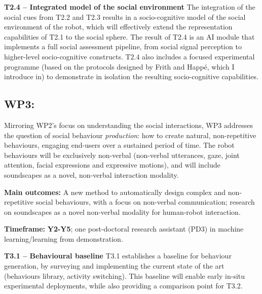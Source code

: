 \textbf{T2.4 -- Integrated model of the social environment} The integration of
the social cues from T2.2 and T2.3 results in a socio-cognitive model of the
social environment of the robot, which will effectively extend the representation
capabilities of T2.1 to the social sphere. The result of T2.4 is an AI module
that implements a full social assessment pipeline, from social signal perception
to higher-level socio-cognitive constructs. T2.4 also includes a
focused experimental programme (based on the protocols designed by Frith and
Happé, which I introduce in) to
demonstrate in isolation the resulting socio-cognitive capabilities.


\subsection{WP3: \textbf{\wpThree}} 

Mirroring WP2's focus on understanding the social interactions, WP3 addresses the
question of social behaviour \emph{production}: how to create natural,
non-repetitive behaviours, engaging end-users over a sustained period of time. The robot
behaviours will be exclusively non-verbal (non-verbal utterances, gaze, joint
attention, facial expressions and expressive motions), and will include
soundscapes as a novel, non-verbal interaction modality.

\begin{framed}

    \textbf{Main outcomes:} A new method to automatically design complex and
    non-repetitive social behaviours, with a focus on non-verbal communication;
    research on soundscapes as a novel non-verbal modality for human-robot
    interaction.

    \textbf{Timeframe:} \textbf{Y2-Y5}; one post-doctoral research assistant (PD3) in machine learning/learning from
demonstration.

\end{framed}

\textbf{T3.1 -- Behavioural baseline} T3.1 establishes a baseline for behaviour
generation, by surveying and implementing the current state of the art
(behaviours library, activity switching). This
baseline will enable early in-situ experimental deployments, while also
providing a comparison point for T3.2.

